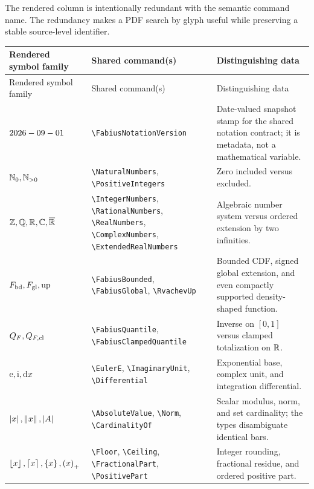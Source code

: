 \documentclass[11pt,oneside]{article}
\theoremstyle{definition}
\theoremstyle{remark}
\DeclareRobustCommand{\commandname}[1]{\texttt{\textbackslash#1}}
\begin{document}
The rendered column is intentionally redundant with the semantic command name.  The
redundancy makes a PDF search by glyph useful while preserving a stable source-level
identifier.

\begingroup\small
\begin{longtable}{@{}L{0.22\textwidth}S{0.38\textwidth}L{0.34\textwidth}@{}}
\toprule
Rendered symbol family & Shared command(s) & Distinguishing data\\
\midrule
\endfirsthead
\toprule
Rendered symbol family & Shared command(s) & Distinguishing data\\
\midrule
\endhead
$2026-09-01$ & \commandname{FabiusNotationVersion} & Date-valued
snapshot stamp for the shared notation contract; it is metadata, not a mathematical
variable.\\
$\mathbb{N}_{0},\mathbb{N}_{>0}$ & \commandname{NaturalNumbers},
\commandname{PositiveIntegers} & Zero included versus excluded.\\
$\mathbb{Z},\mathbb{Q},\mathbb{R},\mathbb{C},
\overline{\mathbb{R}}$ & \commandname{IntegerNumbers}, \commandname{RationalNumbers},
\commandname{RealNumbers}, \commandname{ComplexNumbers},
\commandname{ExtendedRealNumbers} & Algebraic number system versus ordered extension by
two infinities.\\
$F_{\mathrm{bd}},F_{\mathrm{gl}},\operatorname{up}$ & \commandname{FabiusBounded},
\commandname{FabiusGlobal}, \commandname{RvachevUp} & Bounded CDF, signed global
extension, and even compactly supported density-shaped function.\\
$Q_{F},Q_{F,\mathrm{cl}}$ & \commandname{FabiusQuantile},
\commandname{FabiusClampedQuantile} & Inverse on $[0,1]$ versus clamped totalization on
$\mathbb{R}$.\\
$\mathrm{e},\mathrm{i},\mathop{}\!\mathrm{d} x$ & \commandname{EulerE},
\commandname{ImaginaryUnit}, \commandname{Differential} & Exponential base, complex
unit, and integration differential.\\
$\left\lvert x\right\rvert,\left\lVert x\right\rVert,\left\lvert A\right\rvert$ & \commandname{AbsoluteValue},
\commandname{Norm}, \commandname{CardinalityOf} & Scalar modulus, norm, and set
cardinality; the types disambiguate identical bars.\\
$\left\lfloor x\right\rfloor,\left\lceil x\right\rceil,\left\{x\right\},\left(x\right)_{+}$ &
\commandname{Floor}, \commandname{Ceiling}, \commandname{FractionalPart},
\commandname{PositivePart} & Integer rounding, fractional residue, and ordered positive
part.\\

\end{longtable}
\end{document}
